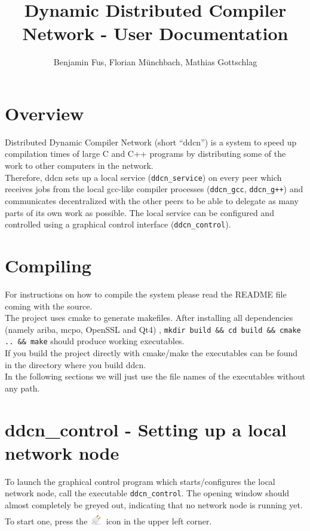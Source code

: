 \documentclass[a4paper,9pt]{scrartcl}
\title{Dynamic Distributed Compiler Network - User Documentation}
\author{Benjamin Fus, Florian Münchbach, Mathias Gottschlag}
\begin{document}
\maketitle

\section{Overview}

Distributed Dynamic Compiler Network (short ``ddcn'') is a system to speed up compilation times of large C and C++ programs by distributing some of the work to other computers in the network.\\Therefore, ddcn sets up a local service (\texttt{ddcn\_service}) on every peer which receives jobs from the local gcc-like compiler processes (\texttt{ddcn\_gcc}, \texttt{ddcn\_g++}) and communicates decentralized with the other peers to be able to delegate as many parts of its own work as possible. The local service can be configured and controlled using a graphical control interface (\texttt{ddcn\_control}).

\section{Compiling}

For instructions on how to compile the system please read the README file coming with the source.\\The project uses cmake to generate makefiles. After installing all dependencies (namely ariba, mcpo, OpenSSL and Qt4)
, \texttt{mkdir build \&\& cd build \&\& cmake .. \&\& make} should produce working executables.\\
If you build the project directly with cmake/make the executables can be found in the directory where you build ddcn.\\
In the following sections we will just use the file names of the executables without any path.

\section{ddcn\_control - Setting up a local network node}

To launch the graphical control program which starts/configures the local network node, call the executable \texttt{ddcn\_control}. The opening window should almost completely be greyed out, indicating that no network node is running yet. To start one, press the 
\includegraphics[scale=0.1,keepaspectratio=true]{../ddcn_control/icons/network-disconnect.png} icon in the upper left corner.\\
\smallskip
\end{document}
